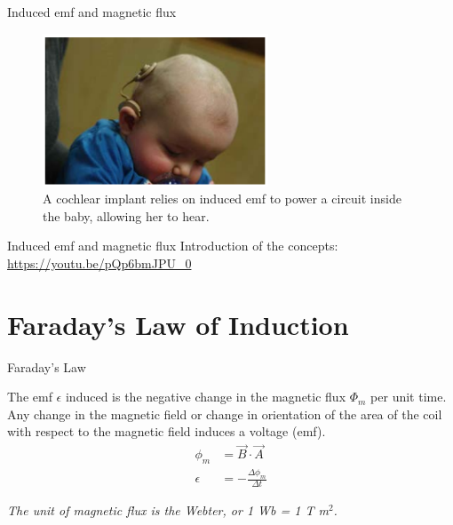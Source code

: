 \documentclass{beamer}
\begin{document}
\begin{frame}{Induced emf and magnetic flux}
\begin{figure}
\centering
\includegraphics[width=0.6\textwidth]{figures/baby.png}
\caption{\label{fig:baby} A cochlear implant relies on induced emf to power a circuit inside the baby, allowing her to hear.}
\end{figure}
\end{frame}

\begin{frame}{Induced emf and magnetic flux}
Introduction of the concepts:
\url{https://youtu.be/pQp6bmJPU_0}
\end{frame}

\section{Faraday's Law of Induction}

\begin{frame}{Faraday's Law}
\begin{tcolorbox}[colback=white,colframe=black!40!black,title=Faraday's Law]
\alert{The emf $\epsilon$ induced is the negative change in the magnetic flux $\Phi_m$ per unit time. Any change in the magnetic field
or change in orientation of the area of the coil with respect to the magnetic field induces a voltage (emf).
\begin{align}
\phi_m &= \vec{B} \cdot \vec{A} \\
\epsilon &= - \frac{\Delta\phi_m}{\Delta t}
\label{eq:farad}
\end{align}}
\end{tcolorbox}
\textit{The unit of magnetic flux is the Webter, or 1 Wb = 1 T m$^2$.}
\end{frame}
\end{document}
